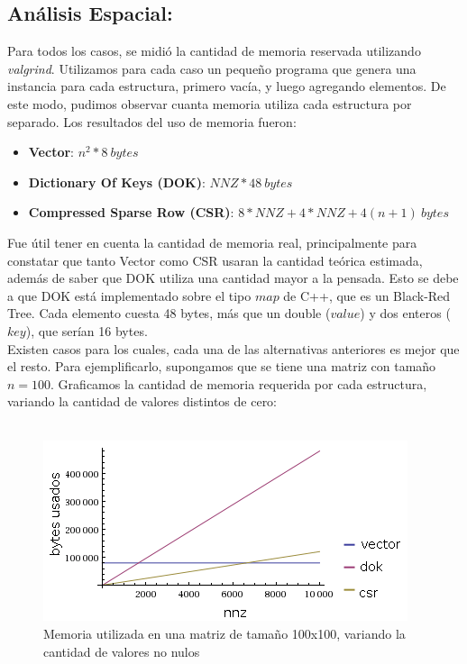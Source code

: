 \subsection{Análisis Espacial:}
Para todos los casos, se midió la cantidad de memoria reservada utilizando \textit{valgrind}. Utilizamos para cada caso un pequeño programa que genera una instancia para cada estructura, primero vacía, y luego agregando elementos. De este modo, pudimos observar cuanta memoria utiliza cada estructura por separado. Los resultados del uso de memoria fueron:\\

\begin{itemize}
	\item \textbf{Vector}: $n^2 * 8\ bytes$
	\item \textbf{Dictionary Of Keys (DOK)}: $NNZ * 48\ bytes$
	\item \textbf{Compressed Sparse Row (CSR)}: $8*NNZ + 4*NNZ + 4 (n+1)\ bytes$
\end{itemize}

Fue útil tener en cuenta la cantidad de memoria real, principalmente para constatar que tanto Vector como CSR usaran la cantidad teórica estimada, además de saber que DOK utiliza una cantidad mayor a la pensada. Esto se debe a que DOK está implementado sobre el tipo $map$ de C++, que es un Black-Red Tree. Cada elemento cuesta 48 bytes, más que un double ($value$) y dos enteros ($key$), que serían 16 bytes.  \\

Existen casos para los cuales, cada una de las alternativas anteriores es mejor que el resto. Para ejemplificarlo, supongamos que se tiene una matriz con tamaño $n=100$. Graficamos la cantidad de memoria requerida por cada estructura, variando la cantidad de valores distintos de cero: \\ \\

\begin{figure}
  \vspace{-20pt}
  \begin{center}
    \includegraphics[scale= 0.6]{imagenes/n100espacio.png}
  \end{center}
  \vspace{-20pt}
   \caption[Caption espacio n 100]{Memoria utilizada en una matriz de tamaño 100x100, variando la cantidad de valores no nulos}
  \vspace{-10pt}
  \label{fig:img1}
\end{figure}

